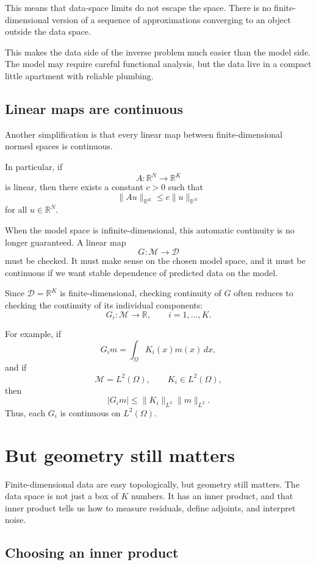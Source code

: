 \documentclass[11pt,a4paper]{book}
\newcommand{\M}{\mathcal{M}}      %
\newcommand{\D}{\mathcal{D}}      %
\newcommand{\R}{\mathbb{R}}
\newcommand{\G}{G}
\begin{document}
This means that data-space limits do not escape the space. There is no
finite-dimensional version of a sequence of approximations converging to an
object outside the data space.

This makes the data side of the inverse problem much easier than the model
side. The model may require careful functional analysis, but the data live in a
compact little apartment with reliable plumbing.

\subsection{Linear maps are continuous}

Another simplification is that every linear map between finite-dimensional
normed spaces is continuous.

In particular, if
\[
    A:\R^N\to\R^K
\]
is linear, then there exists a constant $c>0$ such that
\[
    \|Au\|_{\R^K}
    \leq
    c\|u\|_{\R^N}
\]
for all $u\in\R^N$.

When the model space is infinite-dimensional, this automatic continuity is no
longer guaranteed. A linear map
\[
    \G:\M\to\D
\]
must be checked. It must make sense on the chosen model space, and it must be
continuous if we want stable dependence of predicted data on the model.

Since $\D=\R^K$ is finite-dimensional, checking continuity of $\G$ often reduces
to checking the continuity of its individual components:
\[
    \G_i:\M\to\R,
    \qquad
    i=1,\ldots,K.
\]

For example, if
\[
    \G_i m
    =
    \int_\Omega K_i(x)m(x)\,dx,
\]
and if
\[
    \M=L^2(\Omega),
    \qquad
    K_i\in L^2(\Omega),
\]
then
\[
    |\G_i m|
    \leq
    \|K_i\|_{L^2}\|m\|_{L^2}.
\]
Thus, each $\G_i$ is continuous on $L^2(\Omega)$.

\section{But geometry still matters}

Finite-dimensional data are easy topologically, but geometry still matters.
The data space is not just a box of $K$ numbers. It has an inner product, and
that inner product tells us how to measure residuals, define adjoints, and
interpret noise.

\subsection{Choosing an inner product}
\end{document}
